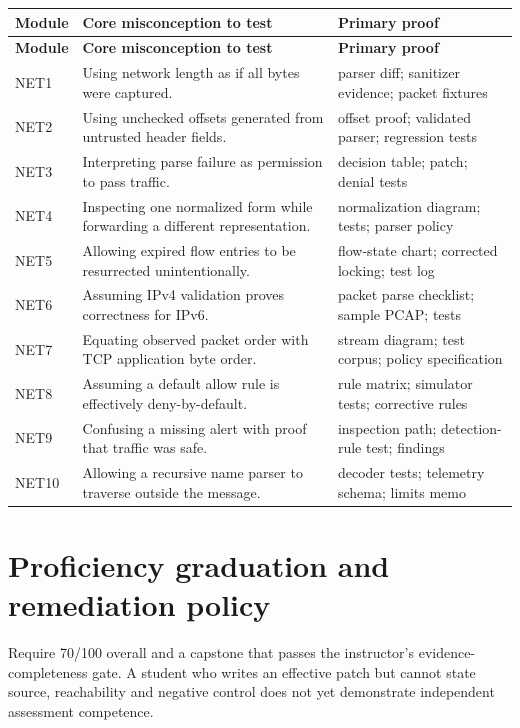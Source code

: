 \documentclass[10pt,letterpaper]{article}
\begin{document}
\begingroup\footnotesize\setlength\tabcolsep{3pt}
\begin{longtable}{>{\raggedright\arraybackslash}p{}>{\raggedright\arraybackslash}p{}>{\raggedright\arraybackslash}p{}}\toprule
\textbf{Module} & \textbf{Core misconception to test} & \textbf{Primary proof}\\\midrule\endfirsthead
\toprule \textbf{Module} & \textbf{Core misconception to test} & \textbf{Primary proof}\\\midrule\endhead
NET1 & Using network length as if all bytes were captured. & parser diff; sanitizer evidence; packet fixtures\\\midrule
NET2 & Using unchecked offsets generated from untrusted header fields. & offset proof; validated parser; regression tests\\\midrule
NET3 & Interpreting parse failure as permission to pass traffic. & decision table; patch; denial tests\\\midrule
NET4 & Inspecting one normalized form while forwarding a different representation. & normalization diagram; tests; parser policy\\\midrule
NET5 & Allowing expired flow entries to be resurrected unintentionally. & flow-state chart; corrected locking; test log\\\midrule
NET6 & Assuming IPv4 validation proves correctness for IPv6. & packet parse checklist; sample PCAP; tests\\\midrule
NET7 & Equating observed packet order with TCP application byte order. & stream diagram; test corpus; policy specification\\\midrule
NET8 & Assuming a default allow rule is effectively deny-by-default. & rule matrix; simulator tests; corrective rules\\\midrule
NET9 & Confusing a missing alert with proof that traffic was safe. & inspection path; detection-rule test; findings\\\midrule
NET10 & Allowing a recursive name parser to traverse outside the message. & decoder tests; telemetry schema; limits memo\\\midrule
\bottomrule\end{longtable}\endgroup
\section{Proficiency graduation and remediation policy}
Require 70/100 overall and a capstone that passes the instructor's evidence-completeness gate. A student who writes an effective patch but cannot state source, reachability and negative control does not yet demonstrate independent assessment competence.
\end{document}
